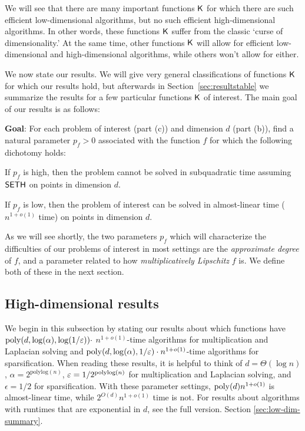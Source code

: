 We will see that there are many important functions $\mathsf{K}$ for which there are such efficient low-dimensional algorithms, but no such efficient high-dimensional algorithms. In other words, these functions $\mathsf{K}$ suffer from the classic `curse of dimensionality.' At the same time, other functions $\mathsf{K}$ will allow for efficient low-dimensional and high-dimensional algorithms, while others won't allow for either.

We now state our results. We will give very general classifications of functions $\mathsf{K}$ for which our results hold, but afterwards in Section~\ref{sec:resultstable} we summarize the results for a few particular functions $\mathsf{K}$ of interest. The main goal of our results is as follows:


\textbf{Goal}: For each problem of interest (part (c)) and dimension $d$ (part (b)), find a natural parameter $p_f > 0$ associated with the function $f$ for which the following dichotomy holds:

\begin{compactitem}
    \item If $p_f$ is high, then the problem cannot be solved in subquadratic time assuming $\mathsf{SETH}$ on points in dimension $d$.
    \item If $p_f$ is low, then the problem of interest can be solved in almost-linear time ($n^{1+o(1)}$ time) on points in dimension $d$.
\end{compactitem}



As we will see shortly, the two parameters $p_f$ which will characterize the difficulties of our problems of interest in most settings are the \emph{approximate degree} of $f$, and a parameter related to how \emph{multiplicatively Lipschitz} $f$ is. We define both of these in the next section.



\subsection{High-dimensional results}\label{subsubsec:highdimmult}

We begin in this subsection by stating our results about which functions have $\mathrm{poly}(d,\log(\alpha),\log(1/\varepsilon)) \cdot$ $n^{1+o(1)}$-time algorithms for multiplication and Laplacian solving and $\mathrm{poly}(d,\log(\alpha),1/\varepsilon)\cdot n^{1+o(1)}$-time algorithms for sparsification. When reading these results, it is helpful to think of $d = \Theta(\log n)$, $\alpha = 2^{\text{polylog}(n)}$, $\varepsilon = 1/2^{\mathrm{polylog}(n)}$ for multiplication and Laplacian solving, and $\epsilon = 1/2$ for sparsification. With these parameter settings, $\mathrm{poly}(d)n^{1+o(1)}$ is almost-linear time, while $2^{O(d)}n^{1+o(1)}$ time is not. For results about algorithms with runtimes that are exponential in $d$, see 
\ifdefined\isfocs
the full version.
\else
Section \ref{sec:low-dim-summary}.
\fi

